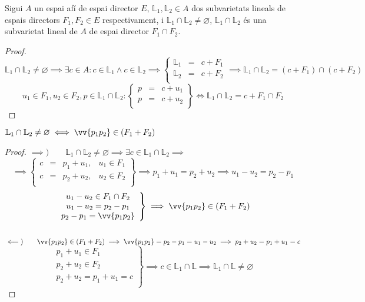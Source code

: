 \begin{prop}
	Sigui $A$ un espai afí de espai director $E$, $\mathbb{L}_1,\mathbb{L}_2\in A$ dos subvarietats lineals de espais directors $F_1,F_2\in E$ respectivament, i $\mathbb{L}_1\cap\mathbb{L}_2\neq\varnothing$, $\mathbb{L}_1\cap\mathbb{L}_2$ és una subvarietat lineal de $A$ de espai director $F_1\cap F_2$.
\end{prop}
\begin{proof}
	\[\mathbb{L}_1\cap\mathbb{L}_2\neq\varnothing\implies\exists c\in A: c\in\mathbb{L}_1\land c\in\mathbb{L}_2\implies\left\{\begin{array}{rcl}
		\mathbb{L}_1 & = & c+F_1 \\
		\mathbb{L}_2 & = & c+F_2 \\
	\end{array}\right.\implies\mathbb{L}_1\cap\mathbb{L}_2=(c+F_1)\cap (c+F_2)\]
	\[ u_1\in F_1, u_2\in F_2, p\in \mathbb{L}_1\cap\mathbb{L}_2: \left\{\begin{array}{rcl}
		p & = & c+u_1 \\
		p & = & c+u_2 \\
	\end{array}\right\}\iff\mathbb{L}_1\cap\mathbb{L}_2=c+F_1\cap F_2\]
\end{proof}

\begin{prop}
	$\mathbb{L}_1\cap\mathbb{L}_2\neq\varnothing\iff\vv{p_1p_2}\in(F_1+F_2)$
\end{prop}
\begin{proof}
	$\implies )\hspace{2em}\mathbb{L}_1\cap\mathbb{L}_2\neq\varnothing\implies\exists c\in\mathbb{L}_1\cap\mathbb{L}_2\implies$
	\[\implies\left\{\begin{array}{rcll}
		c & = & p_1+u_1, & u_1\in F_1 \\
		c & = & p_2+u_2, & u_2\in F_2 \\
	\end{array}\right\}\implies p_1+u_1=p_2+u_2\implies u_1-u_2=p_2-p_1\]
	\[\left.\begin{array}{c}
		u_1-u_2\in F_1\cap F_2 \\
		u_1-u_2=p_2-p_1        \\
		p_2-p_1=\vv{p_1p_2}    \\
	\end{array}\right\}\implies\vv{p_1p_2}\in (F_1+F_2)\] \\
	$\impliedby )\hspace{2em}\vv{p_1p_2}\in (F_1+F_2)\implies\vv{p_1p_2}=p_2-p_1=u_1-u_2\implies p_2+u_2=p_1+u_1=c$
	\[\left.\begin{array}{r}
		p_1+u_1\in F_1    \\
		p_2+u_2\in F_2    \\
		p_2+u_2=p_1+u_1=c \\
	\end{array}\right\}\implies c\in\mathbb{L}_1\cap\mathbb{L}\implies\mathbb{L}_1\cap\mathbb{L}\neq\varnothing\]
\end{proof}

